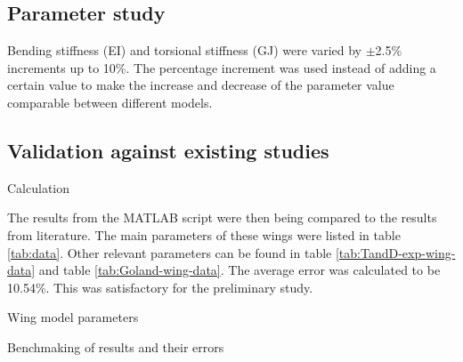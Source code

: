 \documentclass[11pt]{article}
\begin{document}
\subsection{Parameter study}
Bending stiffness (EI) and torsional stiffness (GJ) were varied by $\pm$2.5\% increments up to 10\%. The percentage increment was used instead of adding a certain value to make the increase and decrease of the parameter value comparable between different models. 

\subsection{Validation against existing studies}
Calculation

The results from the MATLAB script were then being compared to the results from literature. The main parameters of these wings were listed in table \ref{tab:data}. Other relevant parameters can be found in table \ref{tab:TandD-exp-wing-data} and table \ref{tab:Goland-wing-data}. The average error was calculated to be 10.54\%. This was satisfactory for the preliminary study.
\begin{table}[H]
    \centering
    \caption{Wing model parameters}
    
    \label{tab:data}
\end{table}
\begin{table}[H]
    \centering
    \caption{Benchmaking of results and their errors}
    
    \label{tab:error}
\end{table}


\end{document}
